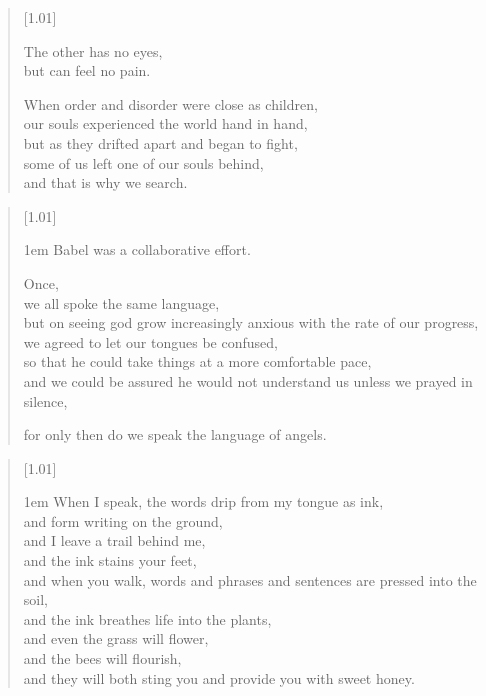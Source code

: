 \begin{paracol}{2}
\begin{verse}[1.01\textwidth]
{    The other has no eyes,\\
    \vin \vin but can feel no pain.

    When order and disorder were close as children,\\
    \vin our souls experienced the world hand in hand,\\
    \vin \vin but as they drifted apart and began to fight,\\
    \vin \vin \vin some of us left one of our souls behind,\\
    \vin \vin \vin \vin and that is why we search.
    }
\end{verse}
\vfill
\newpage

\null
\vfill
\begin{verse}[1.01\textwidth]
    {\vgap1em
    Babel was a collaborative effort.

    Once,\\
    we all spoke the same language,\\
    \vin but on seeing god grow increasingly anxious with the rate of our progress,\\
    \vin \vin we agreed to let our tongues be confused,\\
    \vin \vin \vin so that he could take things at a more comfortable pace,\\
    \vin \vin \vin \vin and we could be assured he would not understand us \mbox{unless} we prayed in silence,

    for only then do we speak the language of angels.}
\end{verse}
\vfill
\newpage

\null
\vfill
\begin{verse}[1.01\textwidth]
    {\vgap1em
    When I speak, the words drip from my tongue as ink,\\
    and form writing on the ground,\\
    and I leave a trail behind me,\\
    and the ink stains your feet,\\
    and when you walk, words and phrases and sentences are pressed into the soil,\\
    and the ink breathes life into the plants,\\
    and even the grass will flower,\\
    and the bees will flourish,\\
    and they will both sting you and provide you with sweet honey.

}
\end{verse}
\end{paracol}
